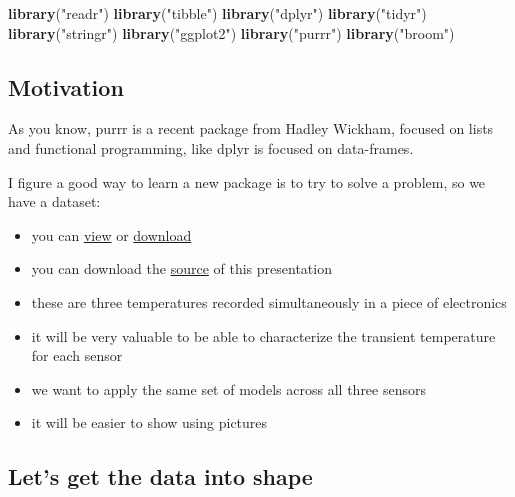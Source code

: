 \documentclass[]{book}
\newenvironment{Shaded}{\begin{snugshade}}{\end{snugshade}}
\newcommand{\KeywordTok}[1]{\textcolor[rgb]{0.13,0.29,0.53}{\textbf{#1}}}
\newcommand{\NormalTok}[1]{#1}
\newcommand{\StringTok}[1]{\textcolor[rgb]{0.31,0.60,0.02}{#1}}
\begin{document}
\begin{Shaded}
\begin{Highlighting}[]
\KeywordTok{library}\NormalTok{(}\StringTok{"readr"}\NormalTok{)}
\KeywordTok{library}\NormalTok{(}\StringTok{"tibble"}\NormalTok{)}
\KeywordTok{library}\NormalTok{(}\StringTok{"dplyr"}\NormalTok{)}
\KeywordTok{library}\NormalTok{(}\StringTok{"tidyr"}\NormalTok{)}
\KeywordTok{library}\NormalTok{(}\StringTok{"stringr"}\NormalTok{)}
\KeywordTok{library}\NormalTok{(}\StringTok{"ggplot2"}\NormalTok{)}
\KeywordTok{library}\NormalTok{(}\StringTok{"purrr"}\NormalTok{)}
\KeywordTok{library}\NormalTok{(}\StringTok{"broom"}\NormalTok{)}
\end{Highlighting}
\end{Shaded}

\hypertarget{motivation}{%
\subsection{Motivation}\label{motivation}}

As you know, purrr is a recent package from Hadley Wickham, focused on lists and functional programming, like dplyr is focused on data-frames.

I figure a good way to learn a new package is to try to solve a problem, so we have a dataset:

\begin{itemize}
\item
  you can \href{https://github.com/ijlyttle/isugg_purrr/blob/gh-pages/temperature.csv}{view} or \href{http://ijlyttle.github.io/isugg_purrr/temperature.csv}{download}
\item
  you can download the \href{http://ijlyttle.github.io/isugg_purrr/presentation.Rmd}{source} of this presentation
\item
  these are three temperatures recorded simultaneously in a piece of electronics
\item
  it will be very valuable to be able to characterize the transient temperature for each sensor
\item
  we want to apply the same set of models across all three sensors
\item
  it will be easier to show using pictures
\end{itemize}

\hypertarget{lets-get-the-data-into-shape}{%
\subsection{Let's get the data into shape}\label{lets-get-the-data-into-shape}}
\end{document}
